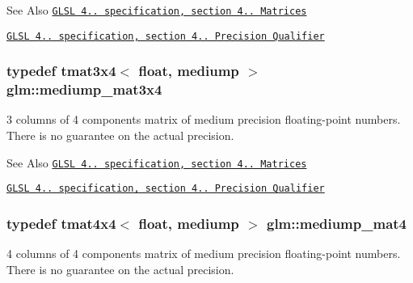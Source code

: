 \begin{DoxySeeAlso}{See Also}
\href{http://www.opengl.org/registry/doc/GLSLangSpec.4.20.8.pdf}{\tt G\-L\-S\-L 4.. specification, section 4.. Matrices} 

\href{http://www.opengl.org/registry/doc/GLSLangSpec.4.20.8.pdf}{\tt G\-L\-S\-L 4.. specification, section 4.. Precision Qualifier} 
\end{DoxySeeAlso}
\hypertarget{group__core__precision_ga0ea90a4a20efa6c104c7ad21144ccefe}{
\subsubsection[{mediump\-\_\-mat3x4}]{\setlength{\rightskip}{0pt plus 5cm}typedef tmat3x4$<$ float, mediump $>$ {\bf glm\-::mediump\-\_\-mat3x4}}}\label{group__core__precision_ga0ea90a4a20efa6c104c7ad21144ccefe}
3 columns of 4 components matrix of medium precision floating-\/point numbers. There is no guarantee on the actual precision.

\begin{DoxySeeAlso}{See Also}
\href{http://www.opengl.org/registry/doc/GLSLangSpec.4.20.8.pdf}{\tt G\-L\-S\-L 4.. specification, section 4.. Matrices} 

\href{http://www.opengl.org/registry/doc/GLSLangSpec.4.20.8.pdf}{\tt G\-L\-S\-L 4.. specification, section 4.. Precision Qualifier} 
\end{DoxySeeAlso}
\hypertarget{group__core__precision_ga2bd55bee1eaded7673421b1ae24175d5}{
\subsubsection[{mediump\-\_\-mat4}]{\setlength{\rightskip}{0pt plus 5cm}typedef tmat4x4$<$ float, mediump $>$ {\bf glm\-::mediump\-\_\-mat4}}}\label{group__core__precision_ga2bd55bee1eaded7673421b1ae24175d5}
4 columns of 4 components matrix of medium precision floating-\/point numbers. There is no guarantee on the actual precision.

